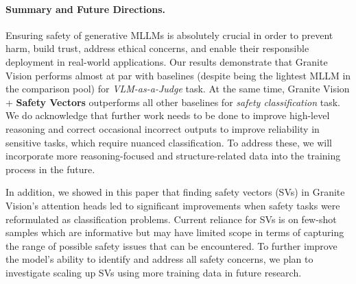 
\paragraph{Summary and Future Directions.} Ensuring safety of generative MLLMs is absolutely crucial in order to prevent harm, build trust, address ethical concerns, and enable their responsible deployment in real-world applications. Our results demonstrate that Granite Vision performs almost at par with baselines (despite being the lightest MLLM in the comparison pool) for {\it VLM-as-a-Judge} task. At the same time, Granite Vision + {\bf Safety Vectors} outperforms all other baselines for {\it safety classification} task. We do acknowledge that further work needs to be done to improve high-level reasoning and correct occasional incorrect outputs to improve reliability in sensitive tasks, which require nuanced classification. To address these, we will incorporate more reasoning-focused and structure-related data into the training process in the future.

In addition, we showed in this paper that finding safety vectors (SVs) in Granite Vision's attention heads led to significant improvements when safety tasks were reformulated as classification problems. Current reliance for SVs is on few-shot samples which are informative but may have limited scope in terms of capturing the range of possible safety issues that can be encountered. To further improve the model's ability to identify and address all safety concerns, we plan to investigate scaling up SVs using more training data in future research.

